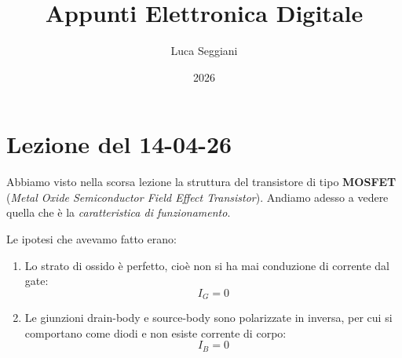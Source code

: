 \documentclass[a4paper,11pt]{article}
\title{Appunti Elettronica Digitale}
\author{Luca Seggiani}
\date{2026}
\begin{document}
\section{Lezione del 14-04-26}

\thispagestyle{empty}
\pagestyle{fancy}

Abbiamo visto nella scorsa lezione la struttura del transistore di tipo \textbf{MOSFET} (\textit{Metal Oxide Semiconductor Field Effect Transistor}). Andiamo adesso a vedere quella che è la \textit{caratteristica di funzionamento}.

Le ipotesi che avevamo fatto erano:
\begin{enumerate}
	\item Lo strato di ossido è perfetto, cioè non si ha mai conduzione di corrente dal gate:
		$$
		I_G = 0
		$$
	\item Le giunzioni drain-body e source-body sono polarizzate in inversa, per cui si comportano come diodi e non esiste corrente di corpo:
		$$
		I_B = 0
		$$
\end{enumerate}
\end{document}
